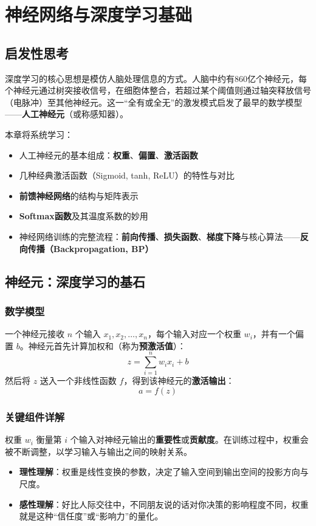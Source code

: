 \chapter{神经网络与深度学习基础}

\section{启发性思考}
深度学习的核心思想是模仿人脑处理信息的方式。人脑中约有860亿个神经元，每个神经元通过树突接收信号，在细胞体整合，若超过某个阈值则通过轴突释放信号（电脉冲）至其他神经元。这一“全有或全无”的激发模式启发了最早的数学模型——\textbf{人工神经元}（或称感知器）。

本章将系统学习：
\begin{itemize}
    \item 人工神经元的基本组成：\textbf{权重}、\textbf{偏置}、\textbf{激活函数}
    \item 几种经典激活函数（Sigmoid, tanh, ReLU）的特性与对比
    \item \textbf{前馈神经网络}的结构与矩阵表示
    \item \textbf{Softmax函数}及其温度系数的妙用
    \item 神经网络训练的完整流程：\textbf{前向传播}、\textbf{损失函数}、\textbf{梯度下降}与核心算法——\textbf{反向传播（Backpropagation, BP）}
\end{itemize}

\section{神经元：深度学习的基石}

\subsection{数学模型}
一个神经元接收 $n$ 个输入 $x_1, x_2, \ldots, x_n$，每个输入对应一个权重 $w_i$，并有一个偏置 $b$。神经元首先计算加权和（称为\textbf{预激活值}）：
\[
z = \sum_{i=1}^{n} w_i x_i + b
\]
然后将 $z$ 送入一个非线性函数 $f$，得到该神经元的\textbf{激活输出}：
\[
a = f(z)
\]

\subsection{关键组件详解}

\begin{definition}[权重（Weight）]
权重 $w_i$ 衡量第 $i$ 个输入对神经元输出的\textbf{重要性}或\textbf{贡献度}。在训练过程中，权重会被不断调整，以学习输入与输出之间的映射关系。
\begin{itemize}
    \item \textbf{理性理解}：权重是线性变换的参数，决定了输入空间到输出空间的投影方向与尺度。
    \item \textbf{感性理解}：好比人际交往中，不同朋友说的话对你决策的影响程度不同，权重就是这种“信任度”或“影响力”的量化。
\end{itemize}
\end{definition}


